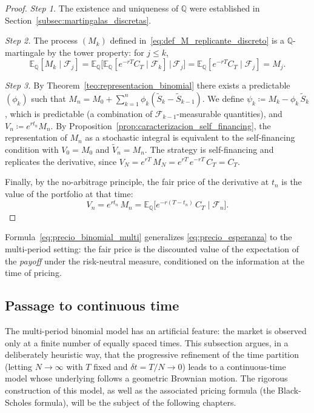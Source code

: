 \documentclass[11pt,a4paper,oneside]{report}
\theoremstyle{plain}
\theoremstyle{definition}
\theoremstyle{remark}
\newcommand{\E}{\mathbb{E}}
\newcommand{\Q}{\mathbb{Q}}
\newcommand{\F}{\mathcal{F}}
\newcommand{\1}{\mathbf{1}}
\newcommand{\eqdef}{\coloneqq}
\begin{document}
\begin{proof}
\emph{Step 1.} The existence and uniqueness of $\Q$ were established
in Section~\ref{subsec:martingalas_discretas}.

\emph{Step 2.} The process $(M_k)$ defined
in~\eqref{eq:def_M_replicante_discreto} is a $\Q$-martingale by the
tower property: for $j \leq k$,
\begin{equation*}
  \E_\Q[M_k \mid \F_j]
  = \E_\Q\bigl[\E_\Q[e^{-rT} C_T \mid \F_k] \,\big|\, \F_j\bigr]
  = \E_\Q[e^{-rT} C_T \mid \F_j] = M_j.
\end{equation*}

\emph{Step 3.} By Theorem~\ref{teo:representacion_binomial} there
exists a predictable $(\phi_k)$ such that
$M_n = M_0 + \sum_{k=1}^n \phi_k(\widetilde S_k - \widetilde S_{k-1})$.
We define $\psi_k \eqdef M_k - \phi_k\, \widetilde S_k$, which is
predictable (a combination of $\F_{k-1}$-measurable quantities), and
$V_n \eqdef e^{r t_n} M_n$. By
Proposition~\ref{prop:caracterizacion_self_financing}, the
representation of $M_n$ as a stochastic integral is equivalent to the
self-financing condition with $V_0 = M_0$ and $\widetilde V_n = M_n$.
The strategy is self-financing and replicates the derivative, since
$V_N = e^{rT}\, M_N = e^{rT}\, e^{-rT}\, C_T = C_T$.

Finally, by the no-arbitrage principle, the fair price of the
derivative at $t_n$ is the value of the portfolio at that time:
\begin{equation*}
  V_n = e^{r t_n}\, M_n = \E_\Q\bigl[e^{-r(T - t_n)}\, C_T \mid \F_n\bigr].
\end{equation*}
\end{proof}

Formula~\eqref{eq:precio_binomial_multi} generalizes
\eqref{eq:precio_esperanza} to the multi-period setting: the fair
price is the discounted value of the expectation of the \emph{payoff}
under the risk-neutral measure, conditioned on the information at the
time of pricing.

\subsection{Passage to continuous time}
\label{subsec:obertura_continuo}

The multi-period binomial
model has an artificial feature: the market is observed only at a
finite number of equally spaced times. This subsection argues, in a
deliberately heuristic way, that the progressive refinement of the
time partition (letting $N \to \infty$ with $T$ fixed and
$\delta t = T/N \to 0$) leads to a continuous-time model whose
underlying follows a geometric Brownian motion. The rigorous
construction of this model, as well as the associated pricing formula
(the Black-Scholes formula), will be the subject of the following
chapters.
\end{document}
